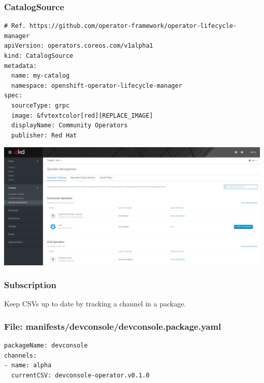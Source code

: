 \documentclass[aspectratio=169]{beamer}
\begin{document}
\begin{frame}[fragile]
  \frametitle{CatalogSource}

  \begin{Verbatim}[fontsize=\small,commandchars=&\[\]]
# Ref. https://github.com/operator-framework/operator-lifecycle-manager
apiVersion: operators.coreos.com/v1alpha1
kind: CatalogSource
metadata:
  name: my-catalog
  namespace: openshift-operator-lifecycle-manager
spec:
  sourceType: grpc
  image: &fvtextcolor[red][REPLACE_IMAGE]
  displayName: Community Operators
  publisher: Red Hat
  \end{Verbatim}
\end{frame}

\begin{frame}

  \includegraphics[scale=.20]{images/catsrc.png}

\end{frame}

\begin{frame}

  \frametitle{Subscription}

  Keep CSVs up to date by tracking a channel in a package.

\end{frame}

\begin{frame}[fragile]

  \frametitle{File: manifests/devconsole/devconsole.package.yaml}

  \begin{Verbatim}[fontsize=\small]
packageName: devconsole
channels:
- name: alpha
  currentCSV: devconsole-operator.v0.1.0
  \end{Verbatim}
\end{frame}
\end{document}
